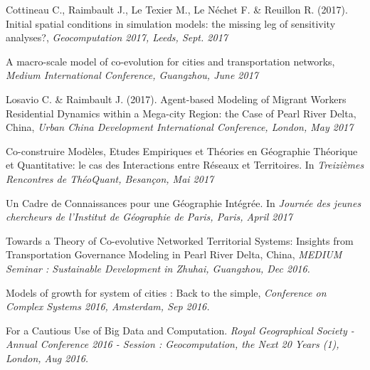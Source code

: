 \bigskip


\noindent Cottineau C., Raimbault J., Le Texier M., Le N{\'e}chet F. \& Reuillon R. (2017). Initial spatial conditions in simulation models: the missing leg of sensitivity analyses?, \textit{Geocomputation 2017, Leeds, Sept. 2017}

\bigskip


\noindent A macro-scale model of co-evolution for cities and transportation networks, \textit{Medium International Conference, Guangzhou, June 2017}


\bigskip

\noindent Losavio C. \& Raimbault J. (2017). Agent-based Modeling of Migrant Workers Residential Dynamics within a Mega-city Region: the Case of Pearl River Delta, China, \textit{Urban China Development International Conference, London, May 2017}


\bigskip

\noindent Co-construire Modèles, Etudes Empiriques et Théories en Géographie Théorique et Quantitative: le cas des Interactions entre Réseaux et Territoires. In \textit{Treizièmes Rencontres de ThéoQuant, Besançon, Mai 2017}


\bigskip

\noindent Un Cadre de Connaissances pour une Géographie Intégrée. In \textit{Journée des jeunes chercheurs de l'Institut de Géographie de Paris, Paris, April 2017}


\bigskip


\noindent Towards a Theory of Co-evolutive Networked Territorial Systems: Insights from Transportation Governance Modeling in Pearl River Delta, China, \textit{MEDIUM Seminar : Sustainable Development in Zhuhai, Guangzhou, Dec 2016.}


\bigskip


\noindent Models of growth for system of cities : Back to the simple, \textit{Conference on Complex Systems 2016, Amsterdam, Sep 2016.}





\bigskip

\noindent For a Cautious Use of Big Data and Computation. \textit{Royal Geographical Society - Annual Conference 2016 - Session : Geocomputation, the Next 20 Years (1), London, Aug 2016.}


\bigskip

